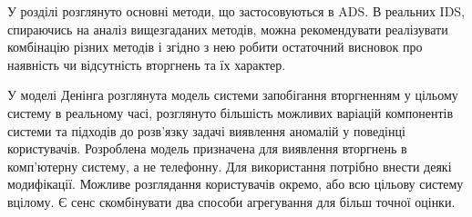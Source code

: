     У розділі розглянуто основні методи, що застосовуються в ADS. В реальних IDS,
    спираючись на аналіз вищезгаданих методів, можна рекомендувати реалізувати
    комбінацію різних методів і згідно з нею робити остаточний висновок про наявність
    чи відсутність вторгнень та їх характер.

    У моделі Денінга розглянута модель системи запобігання вторгненням у цільому
    систему в реальному часі, розглянуто більшість можливих варіацій компонентів
    системи та підходів до розв'язку задачі виявлення аномалій у поведінці
    користувачів. Розроблена модель призначена для виявлення вторгнень в
    комп'ютерну систему, а не телефонну. Для використання потрібно внести деякі
    модифікації. Можливе розглядання користувачів окремо, або всю цільову
    систему вцілому. Є сенс скомбінувати два способи агрегування для більш
    точної оцінки.
